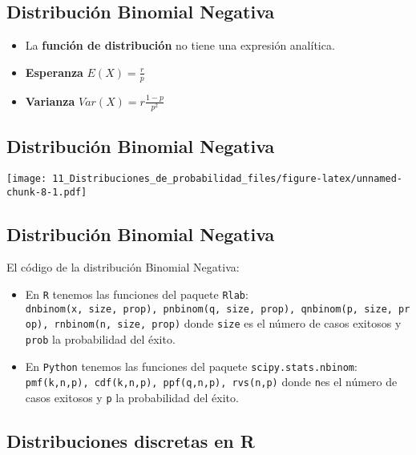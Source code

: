 \documentclass[
]{article}
\providecommand{\tightlist}{%
  \setlength{\itemsep}{0pt}\setlength{\parskip}{0pt}}
\begin{document}
\hypertarget{distribuciuxf3n-binomial-negativa-1}{%
\subsection{Distribución Binomial
Negativa}\label{distribuciuxf3n-binomial-negativa-1}}

\begin{itemize}
\tightlist
\item
  La \textbf{función de distribución} no tiene una expresión analítica.
\item
  \textbf{Esperanza} \(E(X) = \frac{r}{p}\)
\item
  \textbf{Varianza} \(Var(X) = r\frac{1-p}{p^2}\)
\end{itemize}

\hypertarget{distribuciuxf3n-binomial-negativa-2}{%
\subsection{Distribución Binomial
Negativa}\label{distribuciuxf3n-binomial-negativa-2}}

\texttt{[image: 11\_Distribuciones\_de\_probabilidad\_files/figure-latex/unnamed-chunk-8-1.pdf]}

\hypertarget{distribuciuxf3n-binomial-negativa-3}{%
\subsection{Distribución Binomial
Negativa}\label{distribuciuxf3n-binomial-negativa-3}}

El código de la distribución Binomial Negativa:

\begin{itemize}
\tightlist
\item
  En \texttt{R} tenemos las funciones del paquete \texttt{Rlab}:
  \texttt{dnbinom(x,\ size,\ prop),\ pnbinom(q,\ size,\ prop),\ qnbinom(p,\ size,\ prop),\ rnbinom(n,\ size,\ prop)}
  donde \texttt{size} es el número de casos exitosos y \texttt{prob} la
  probabilidad del éxito.
\item
  En \texttt{Python} tenemos las funciones del paquete
  \texttt{scipy.stats.nbinom}:
  \texttt{pmf(k,n,p),\ cdf(k,n,p),\ ppf(q,n,p),\ rvs(n,p)} donde
  \texttt{n}es el número de casos exitosos y \texttt{p} la probabilidad
  del éxito.
\end{itemize}

\hypertarget{distribuciones-discretas-en-r}{%
\subsection{Distribuciones discretas en
R}\label{distribuciones-discretas-en-r}}
\end{document}
